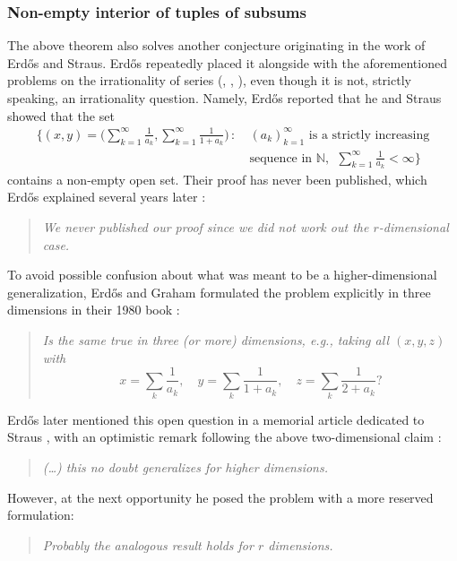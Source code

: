 \documentclass[11pt,letterpaper,reqno]{amsart}
\numberwithin{equation}{section}
\theoremstyle{definition}
\numberwithin{equation}{section}
\begin{document}

\subsubsection{Non-empty interior of tuples of subsums}
The above theorem also solves another conjecture originating in the work of Erd\H{o}s and Straus.
Erd\H{o}s repeatedly placed it alongside with the aforementioned problems on the irrationality of series (\cite[\S7]{EG80}, \cite{Erd85}, \cite{Erd88}), even though it is not, strictly speaking, an irrationality question.
Namely, Erd\H{o}s reported \cite[p.~65]{EG80} that he and Straus showed that the set
\begin{align*}
\bigg\{ (x,y) = \Big( \sum_{k=1}^{\infty}\frac{1}{a_k}, \sum_{k=1}^{\infty}\frac{1}{1+a_k} \Big) \,:\ & \text{$(a_k)_{k=1}^{\infty}$ is a strictly increasing}\\[-3mm]
& \text{sequence in $\mathbb{N}$},\ \ \sum_{k=1}^{\infty}\frac{1}{a_k}<\infty \bigg\}
\end{align*}
contains a non-empty open set.
Their proof has never been published, which Erd\H{o}s explained several years later \cite[p.~105]{Erd88}:
\begin{quote}
\emph{We never published our proof since we did not work out the $r$-dimensional case.}
\end{quote}
To avoid possible confusion about what was meant to be a higher-dimensional generalization, Erd\H{o}s and Graham formulated the problem explicitly in three dimensions in their 1980 book \cite[p.~65]{EG80}:
\begin{quote}
\emph{Is the same true in three (or more) dimensions, e.g., taking all $(x,y,z)$ with
\begin{equation}\label{eq:3Dpoints}
x=\sum_k\frac{1}{a_k},\quad y=\sum_k\frac{1}{1+a_k},\quad z=\sum_k\frac{1}{2+a_k} ?
\end{equation}}
\end{quote}
Erd\H{o}s later mentioned this open question in a memorial article dedicated to Straus \cite{Erd85}, with an optimistic remark following the above two-dimensional claim \cite[p.~334]{Erd85}:
\begin{quote}
\emph{(\ldots) this no doubt generalizes for higher dimensions.}
\end{quote}
However, at the next opportunity \cite[p.~104--105]{Erd88} he posed the problem with a more reserved formulation:
\begin{quote}
\emph{Probably the analogous result holds for $r$ dimensions.}
\end{quote}
\end{document}

